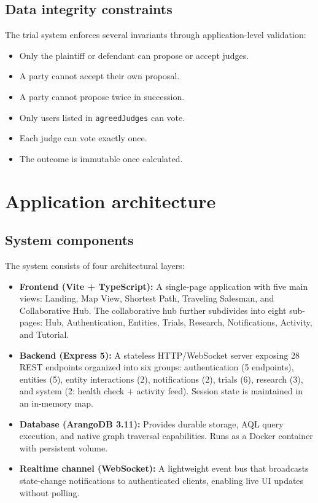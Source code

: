 \documentclass[13pt,a4paper]{report}
\begin{document}
\subsection{Data integrity constraints}
The trial system enforces several invariants through application-level validation:
\begin{itemize}
    \item Only the plaintiff or defendant can propose or accept judges.
    \item A party cannot accept their own proposal.
    \item A party cannot propose twice in succession.
    \item Only users listed in \texttt{agreedJudges} can vote.
    \item Each judge can vote exactly once.
    \item The outcome is immutable once calculated.
\end{itemize}

\section{Application architecture}
\subsection{System components}
The system consists of four architectural layers:
\begin{itemize}
    \item \textbf{Frontend (Vite + TypeScript):} A single-page application with five main views: Landing, Map View, Shortest Path, Traveling Salesman, and Collaborative Hub. The collaborative hub further subdivides into eight sub-pages: Hub, Authentication, Entities, Trials, Research, Notifications, Activity, and Tutorial.
    \item \textbf{Backend (Express 5):} A stateless HTTP/WebSocket server exposing 28 REST endpoints organized into six groups: authentication (5 endpoints), entities (5), entity interactions (2), notifications (2), trials (6), research (3), and system (2: health check + activity feed). Session state is maintained in an in-memory map.
    \item \textbf{Database (ArangoDB 3.11):} Provides durable storage, AQL query execution, and native graph traversal capabilities. Runs as a Docker container with persistent volume.
    \item \textbf{Realtime channel (WebSocket):} A lightweight event bus that broadcasts state-change notifications to authenticated clients, enabling live UI updates without polling.
\end{itemize}
\end{document}
